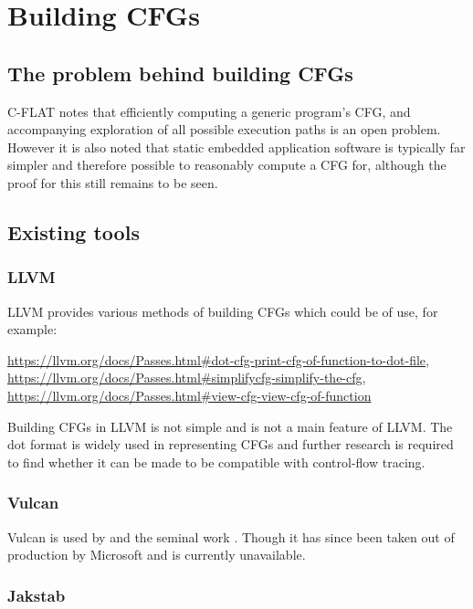 \section{Building CFGs}

\subsection{The problem behind building CFGs}

C-FLAT \cite{Abera2016} notes that efficiently computing a generic program's CFG, and accompanying exploration of all possible execution paths is an open problem. However it is also noted that static embedded application software is typically far simpler and therefore possible to reasonably compute a CFG for, although the proof for this still remains to be seen.

\subsection{Existing tools}

\subsubsection{LLVM}

LLVM provides various methods of building CFGs which could be of use, for example:

\url{https://llvm.org/docs/Passes.html#dot-cfg-print-cfg-of-function-to-dot-file},\\
\url{https://llvm.org/docs/Passes.html#simplifycfg-simplify-the-cfg},\\
\url{https://llvm.org/docs/Passes.html#view-cfg-view-cfg-of-function}

Building CFGs in LLVM is not simple and is not a main feature of LLVM. The dot format is widely used in representing CFGs and further research is required to find whether it can be made to be compatible with control-flow tracing.

\subsubsection{Vulcan}

Vulcan \cite{Edwards2001} is used by \cite{Davi2012} and the seminal work \cite{Abadi2005}. Though it has since been taken out of production by Microsoft and is currently unavailable.

\subsubsection{Jakstab}

